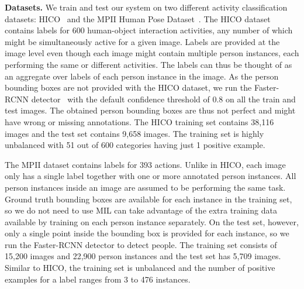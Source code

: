 \documentclass[runningheads]{llncs}
\begin{document}
{\bf Datasets.} We train and test our system on two different activity classification datasets: HICO~\cite{chao2015hico} and the MPII Human Pose Dataset~\cite{pishchulin2014fine}. The HICO dataset contains labels for 600 human-object interaction activities, any number of which might be simultaneously active for a given image. Labels are provided at the image level even though each image might contain multiple person instances, each performing the same or different activities. The labels can thus be thought of as an aggregate over labels of each person instance in the image. As the person bounding boxes are not provided with the HICO dataset, we run the Faster-RCNN detector~\cite{ren2015faster} with the default confidence threshold of 0.8 on all the train and test images. The obtained person bounding boxes are thus not perfect and might have wrong or missing annotations. The HICO training set contains 38,116 images and the test set contains 9,658 images. The training set is highly unbalanced with 51 out of 600 categories having just 1 positive example.

The MPII dataset contains labels for 393 actions. Unlike in HICO, each image only has a single label together with one or more annotated person instances. All person instances inside an image are assumed to be performing the same task. Ground truth bounding boxes are available for each instance in the training set, so we do not need to use MIL can take advantage of the extra training data available by training on each person instance separately. On the test set, however, only a single point inside the bounding box is provided for each instance, so we run the Faster-RCNN detector to detect people. The training set consists of 15,200 images and 22,900 person instances and the test set has 5,709 images. Similar to HICO, the training set is unbalanced and the number of positive examples for a label ranges from 3 to 476 instances.
\end{document}

